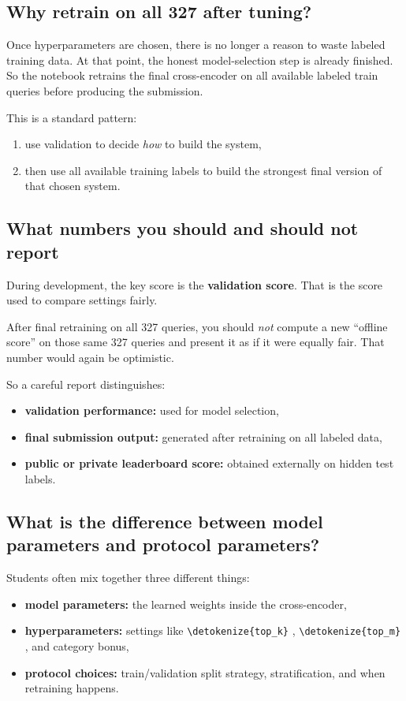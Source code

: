 \documentclass[10pt]{article}
\DeclareRobustCommand{\code}[1]{%
  \ifmmode
    \text{\nolinkurl{\detokenize{#1}}}%
  \else
    \nolinkurl{\detokenize{#1}}%
  \fi
}
\begin{document}
\subsection{Why retrain on all 327 after tuning?}

Once hyperparameters are chosen, there is no longer a reason to waste labeled training data. At that point, the honest model-selection step is already finished. So the notebook retrains the final cross-encoder on all available labeled train queries before producing the submission.

This is a standard pattern:
\begin{enumerate}
    \item use validation to decide \emph{how} to build the system,
    \item then use all available training labels to build the strongest final version of that chosen system.
\end{enumerate}

\subsection{What numbers you should and should not report}

During development, the key score is the \textbf{validation score}. That is the score used to compare settings fairly.

After final retraining on all 327 queries, you should \emph{not} compute a new ``offline score'' on those same 327 queries and present it as if it were equally fair. That number would again be optimistic.

So a careful report distinguishes:
\begin{itemize}
    \item \textbf{validation performance:} used for model selection,
    \item \textbf{final submission output:} generated after retraining on all labeled data,
    \item \textbf{public or private leaderboard score:} obtained externally on hidden test labels.
\end{itemize}

\subsection{What is the difference between model parameters and protocol parameters?}

Students often mix together three different things:
\begin{itemize}
    \item \textbf{model parameters:} the learned weights inside the cross-encoder,
    \item \textbf{hyperparameters:} settings like \code{top_k}, \code{top_m}, and category bonus,
    \item \textbf{protocol choices:} train/validation split strategy, stratification, and when retraining happens.
\end{itemize}
\end{document}
